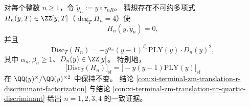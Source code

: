 \begin{conjecture}\label{conj:xi-terminal-zm-translation-nr-discriminant-spine}
对每个整数 \(n\ge 1\)，令 \(\tilde y_n:=y\circ\tau_{nR}\)。
猜想存在不可约多项式 \(H_n(y,T)\in\ZZ[y,T]\)（\(\deg_T H_n=4\)）使
\[
H_n(y,\tilde y_n)=0,
\]
并且
\[
\mathrm{Disc}_{T}(H_n)
=-y^{\alpha_n}(y-1)^{\beta_n}\mathrm{PLY}(y)\cdot D_n(y)^2,
\]
其中 \(\alpha_n,\beta_n\ge 1\)、\(D_n(y)\in\ZZ[y]\)。
特别地，
\[
\bigl[\mathrm{Disc}_{T}(H_n)\bigr]_{\mathrm{sf}}
=\bigl[-y(y-1)\mathrm{PLY}(y)\bigr]_{\mathrm{sf}}
\]
在 \(\QQ(y)^{\times}/\QQ(y)^{\times 2}\) 中保持不变。
结论 \ref{con:xi-terminal-zm-translation-r-discriminant-factorization} 与结论 \ref{con:xi-terminal-zm-translation-nr-quartic-discriminant} 给出 \(n=1,2,3,4\) 的一致证据。
\end{conjecture}

\endinput

